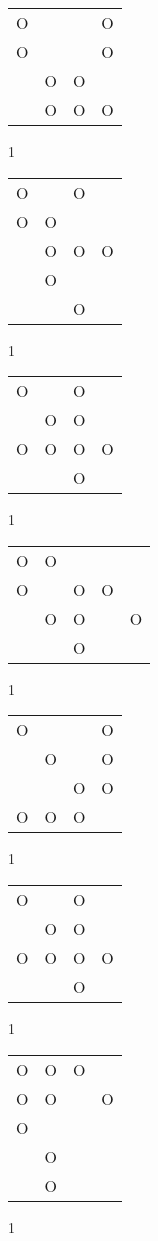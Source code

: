 \begin{tabular}{|m{0.2cm}m{0.2cm}m{0.2cm}m{0.2cm}|}\hline
O& & &O\\
O& & &O\\
 &O&O& \\
 &O&O&O\\
\hline\end{tabular}1
\begin{tabular}{|m{0.2cm}m{0.2cm}m{0.2cm}m{0.2cm}|}\hline
O& &O& \\
O&O& & \\
 &O&O&O\\
 &O& & \\
 & &O& \\
\hline\end{tabular}1
\begin{tabular}{|m{0.2cm}m{0.2cm}m{0.2cm}m{0.2cm}|}\hline
O& &O& \\
 &O&O& \\
O&O&O&O\\
 & &O& \\
\hline\end{tabular}1
\begin{tabular}{|m{0.2cm}m{0.2cm}m{0.2cm}m{0.2cm}m{0.2cm}|}\hline
O&O& & & \\
O& &O&O& \\
 &O&O& &O\\
 & &O& & \\
\hline\end{tabular}1
\begin{tabular}{|m{0.2cm}m{0.2cm}m{0.2cm}m{0.2cm}|}\hline
O& & &O\\
 &O& &O\\
 & &O&O\\
O&O&O& \\
\hline\end{tabular}1
\begin{tabular}{|m{0.2cm}m{0.2cm}m{0.2cm}m{0.2cm}|}\hline
O& &O& \\
 &O&O& \\
O&O&O&O\\
 & &O& \\
\hline\end{tabular}1
\begin{tabular}{|m{0.2cm}m{0.2cm}m{0.2cm}m{0.2cm}|}\hline
O&O&O& \\
O&O& &O\\
O& & & \\
 &O& & \\
 &O& & \\
\hline\end{tabular}1
